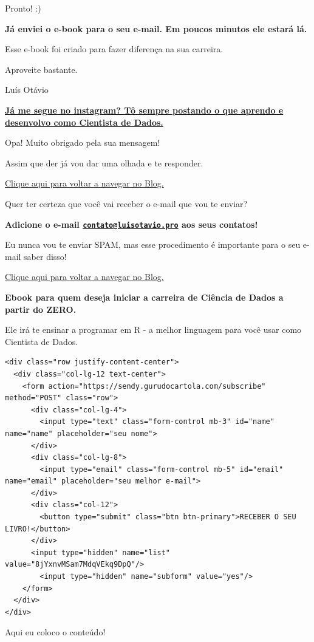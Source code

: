 \documentclass[
]{book}
\begin{document}
Pronto! :)

\textbf{Já enviei o e-book para o seu e-mail. Em poucos minutos ele
estará lá.}

Esse e-book foi criado para fazer diferença na sua carreira.

Aproveite bastante.

Luís Otávio

\href{https://www.instagram.com/_u/luisotavio.pro}{\textbf{Já me segue
no instagram? Tô sempre postando o que aprendo e desenvolvo como
Cientista de Dados.}}

Opa! Muito obrigado pela sua mensagem!

Assim que der já vou dar uma olhada e te responder.

\href{https://luisotavio.pro/}{Clique aqui para voltar a navegar no
Blog.}

Quer ter certeza que você vai receber o e-mail que vou te enviar?

\textbf{Adicione o e-mail
\href{mailto:contato@luisotavio.pro}{\nolinkurl{contato@luisotavio.pro}}
aos seus contatos!}

Eu nunca vou te enviar SPAM, mas esse procedimento é importante para o
seu e-mail saber disso!

\href{https://luisotavio.pro/}{Clique aqui para voltar a navegar no
Blog.}

\textbf{Ebook para quem deseja iniciar a carreira de Ciência de Dados a
partir do ZERO.}

Ele irá te ensinar a programar em R - a melhor linguagem para você usar
como Cientista de Dados.

\begin{verbatim}
<div class="row justify-content-center">
  <div class="col-lg-12 text-center">
    <form action="https://sendy.gurudocartola.com/subscribe" method="POST" class="row">
      <div class="col-lg-4">
        <input type="text" class="form-control mb-3" id="name" name="name" placeholder="seu nome">
      </div>
      <div class="col-lg-8">
        <input type="email" class="form-control mb-5" id="email" name="email" placeholder="seu melhor e-mail">
      </div>
      <div class="col-12">
        <button type="submit" class="btn btn-primary">RECEBER O SEU LIVRO!</button>
      </div>
      <input type="hidden" name="list" value="8jYxnvMSam7MdqVEkq9DpQ"/>
        <input type="hidden" name="subform" value="yes"/>
    </form>
  </div>
</div>
\end{verbatim}

Aqui eu coloco o conteúdo!

\backmatter
\end{document}
